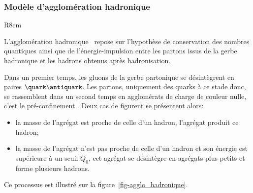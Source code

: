 \subsubsection{Modèle d'agglomération hadronique}\label{chapter-JERC-section-jets-subsec-hadronisation-subsubsec-agglo_hadronique}
\begin{wrapfigure}{R}{8cm}
\centering

\caption[Formation de jets dans le cadre du modèle d'agglomération hadronique.]{Schématisation de l'hadronisation dans le cadre du modèle d'agglomération hadronique.}
\label{fig-agglo_hadronique}
\end{wrapfigure}
L'agglomération hadronique~\cite{Winter_2004} repose sur l'hypothèse de conservation des nombres quantiques ainsi que de l'énergie-impulsion entre les partons issus de la gerbe hadronique et les hadrons obtenus après hadronisation.
\par Dans un premier temps, les gluons de la gerbe partonique se désintègrent en paires $\quark\antiquark$. Les partons, uniquement des quarks à ce stade donc, se rassemblent dans un second temps en agglomérats de charge de couleur nulle, c'est le \og pré-confinement \fg.
Deux cas de figurent se présentent alors:
\begin{itemize}
\item la masse de l'agrégat est proche de celle d'un hadron, l'agrégat produit ce hadron;
\item la masse de l'agrégat n'est pas proche de celle d'un hadron et son énergie est supérieure à un seuil $Q_0$, cet agrégat se désintègre en agrégats plus petits et forme plusieurs hadrons.
\end{itemize}
Ce processus est illustré sur la figure~\ref{fig-agglo_hadronique}.
